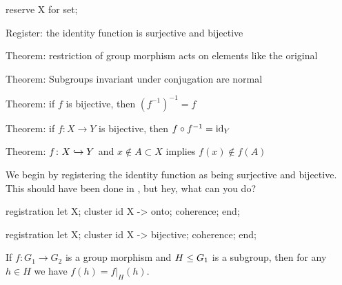 \nwenddocs{}\endmoddef\nwstartdeflinemarkup{}\nwenddeflinemarkup
reserve X for set;

\LA{}Register: the identity function is surjective and bijective~{\nwtagstyle{}}\RA{}

\LA{}Theorem: restriction of group morphism acts on elements like the original~{\nwtagstyle{}}\RA{}

\LA{}Theorem: Subgroups invariant under conjugation are normal~{\nwtagstyle{}}\RA{}

\LA{}Theorem: if $f$ is bijective, then $(f^{-1})^{-1}=f$~{\nwtagstyle{}}\RA{}

\LA{}Theorem: if $f\colon X\to Y$ is bijective, then $f\circ f^{-1}=\operatorname{id}_{Y}$~{\nwtagstyle{}}\RA{}

\LA{}Theorem: $f\colon X\hookrightarrow Y$ and $x\notin A\subset X$ implies $f(x)\notin f(A)$~{\nwtagstyle{}}\RA{}
\nwendcode{}\nwdocspar


\begin{registration}
We begin by registering the identity function as being surjective and
bijective. This should have been done in , but hey, what can
you do?
\end{registration}

\nwenddocs{}\endmoddef\nwstartdeflinemarkup{}\nwenddeflinemarkup
registration
  let X;
  cluster id X -> onto;
  coherence;
end;

registration
  let X;
  cluster id X -> bijective;
  coherence;
end;
\nwendcode{}\nwdocspar

\begin{theorem}\label{thm:characteristic:preparatory:restrict-group-morphism-to-subgroups}
If $f\colon G_{1}\to G_{2}$ is a group morphism and $H\leq G_{1}$
is a subgroup, then for any $h\in H$ we have $f(h) = f|_{H}(h)$.
\end{theorem}

